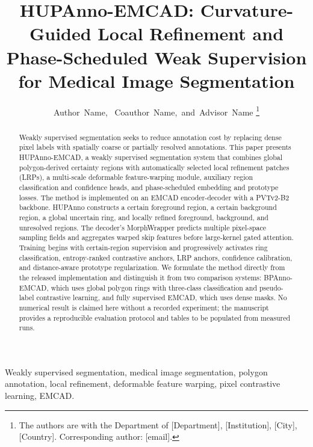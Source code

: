 \documentclass[journal]{IEEEtran}
\begin{document}
\title{HUPAnno-EMCAD: Curvature-Guided Local Refinement and Phase-Scheduled Weak Supervision for Medical Image Segmentation}

\author{Author~Name,~
        Coauthor~Name,~and~Advisor~Name
\thanks{The authors are with the Department of [Department], [Institution], [City], [Country]. Corresponding author: [email].}}


\maketitle

\begin{abstract}
Weakly supervised segmentation seeks to reduce annotation cost by replacing dense pixel labels with spatially coarse or partially resolved annotations. This paper presents HUPAnno-EMCAD, a weakly supervised segmentation system that combines global polygon-derived certainty regions with automatically selected local refinement patches (LRPs), a multi-scale deformable feature-warping module, auxiliary region classification and confidence heads, and phase-scheduled embedding and prototype losses. The method is implemented on an EMCAD encoder-decoder with a PVTv2-B2 backbone. HUPAnno constructs a certain foreground region, a certain background region, a global uncertain ring, and locally refined foreground, background, and unresolved regions. The decoder's MorphWrapper predicts multiple pixel-space sampling fields and aggregates warped skip features before large-kernel gated attention. Training begins with certain-region supervision and progressively activates ring classification, entropy-ranked contrastive anchors, LRP anchors, confidence calibration, and distance-aware prototype regularization. We formulate the method directly from the released implementation and distinguish it from two comparison systems: BPAnno-EMCAD, which uses global polygon rings with three-class classification and pseudo-label contrastive learning, and fully supervised EMCAD, which uses dense masks. No numerical result is claimed here without a recorded experiment; the manuscript provides a reproducible evaluation protocol and tables to be populated from measured runs.
\end{abstract}

\begin{IEEEkeywords}
Weakly supervised segmentation, medical image segmentation, polygon annotation, local refinement, deformable feature warping, pixel contrastive learning, EMCAD.
\end{IEEEkeywords}
\end{document}
